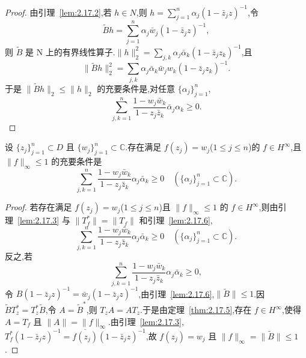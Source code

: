 \begin{proof}
由引理~\ref{lem:2.17.2},若 $h \in N$,则 $h = \sum_{j=1}^{n} \alpha_{j}(1 - \bar{z}_{j}z)^{-1}$,令
\begin{equation*}
\tilde{B}h = \sum_{j=1}^{n} \alpha_{j}\bar{w}_{j}(1 - \bar{z}_{j}z)^{-1},
\end{equation*}
则 $\tilde{B}$ 是 N 上的有界线性算子.$\|h\|_{2}^{2} = \sum_{j,k}\alpha_{j}\bar{\alpha}_{k}(1 - \bar{z}_{j}z_{k})^{-1}$,且
\begin{equation*}
\|\tilde{B}h\|_{2}^{2} = \sum_{j,k}\alpha_{j}\bar{\alpha}_{k}\bar{w}_{j}w_{k}(1 - \bar{z}_{j}z_{k})^{-1}.
\end{equation*}
于是 $\|\tilde{B}h\|_{2} \leq \|h\|_{2}$ 的充要条件是,对任意 $\{\alpha_{j}\}_{j=1}^{n}$,
\begin{equation*}
\sum_{j,k=1}^{n} \frac{1 - w_{j}\bar{w}_{k}}{1 - z_{j}\bar{z}_{k}} \bar{\alpha}_{j}\alpha_{k} \geq 0.
\end{equation*}
\end{proof}

\begin{theorem}[Pick]\label{thm:2.17.7}
设 $\{z_{j}\}_{j=1}^{n} \subset D$ 且 $\{w_{j}\}_{j=1}^{n} \subset \mathbb{C}$.存在满足 $f(z_{j}) = w_{j}$($1 \leq j \leq n$)的 $f \in H^{\infty}$,且 $\|f\|_{\infty} \leq 1$ 的充要条件是
\begin{equation*}
\sum_{j,k=1}^{n} \frac{1 - w_{j}\bar{w}_{k}}{1 - z_{j}\bar{z}_{k}} \alpha_{j}\bar{\alpha}_{k} \geq 0 \quad (\{\alpha_{j}\}_{j=1}^{n} \subset \mathbb{C}).
\end{equation*}
\end{theorem}

\begin{proof}
若存在满足 $f(z_{j}) = w_{j}$($1 \leq j \leq n$)且 $\|f\|_{\infty} \leq 1$ 的 $f \in H^{\infty}$,则由引理~\ref{lem:2.17.3} 与 $\|T_{f}^{*}\| = \|T_{f}\|$ 和引理~\ref{lem:2.17.6},
\begin{equation*}
\sum_{j,k=1}^{n} \frac{1 - w_{j}\bar{w}_{k}}{1 - z_{j}\bar{z}_{k}} \alpha_{j}\bar{\alpha}_{k} \geq 0 \quad (\{\alpha_{j}\}_{j=1}^{n} \subset \mathbb{C}).
\end{equation*}
反之,若
\begin{equation*}
\sum_{j,k=1}^{n} \frac{1 - w_{j}\bar{w}_{k}}{1 - z_{j}\bar{z}_{k}} \alpha_{j}\bar{\alpha}_{k} \geq 0,
\end{equation*}
令 $B(1 - \bar{z}_{j}z)^{-1} = \bar{w}_{j}(1 - \bar{z}_{j}z)^{-1}$,由引理~\ref{lem:2.17.6},$\|\tilde{B}\| \leq 1$.因 $\tilde{B}T_{z}^{*} = T_{z}^{*}\tilde{B}$,令 $A = \tilde{B}^{*}$,则 $T_{z}A = AT_{z}$.于是由定理~\ref{thm:2.17.5},存在 $f \in H^{\infty}$,使得 $A = T_{f}$ 且 $\|A\| = \|f\|_{\infty}$.由引理~\ref{lem:2.17.3},$T_{f}^{*}(1 - \bar{z}_{j}z)^{-1} = \overline{f(z_{j})}(1 - \bar{z}_{j}z)^{-1}$,故 $f(z_{j}) = w_{j}$ 且 $\|f\|_{\infty} = \|\tilde{B}\| \leq 1$.
\end{proof}
